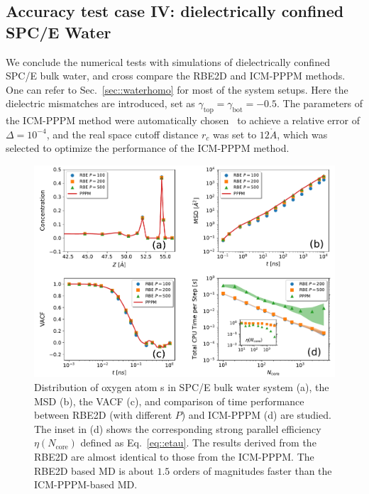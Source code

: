 \subsection{Accuracy test case IV: dielectrically confined SPC/E Water}

We conclude the numerical tests with simulations of dielectrically confined SPC/E bulk water, and cross compare the RBE2D and ICM-PPPM methods. 
One can refer to Sec.~\ref{sec::waterhomo} for most of the system setups.
Here the dielectric mismatches are introduced, set as $\gamma_{\text{top}}=\gamma_{\text{bot}}=-0.5$. 
The parameters of the ICM-PPPM method were automatically chosen~\cite{kolafa1992cutoff} to achieve a relative error of $\Delta=10^{-4}$, and the real space cutoff distance $r_c$ was set to $12\mathring{A}$, which was selected to optimize the performance of the ICM-PPPM method. 

\begin{figure}[ht]
\centering
\includegraphics[width=0.95\linewidth]{figs/Dielectric.pdf}
    \caption{Distribution of oxygen atom {s} in SPC/E bulk water system (a), the MSD (b), the VACF (c), and comparison of time performance between RBE2D (with different $P$) and ICM-PPPM (d) are studied. 
    The inset in (d) shows  {the} corresponding strong parallel efficiency $\eta(N_{\text{core}})$ defined as Eq.~\eqref{eq::etau}. 
    The results derived from the RBE2D   {are} almost identical to those from the ICM-PPPM. 
     {The RBE2D based MD is about $1.5$ orders of magnitudes faster than the ICM-PPPM-based MD.}
    }
    \label{fig:den2}
\end{figure}

